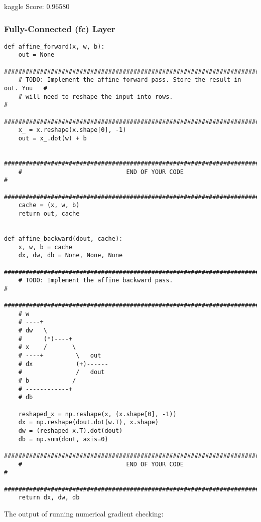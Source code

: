 \documentclass[a4paper,12pt]{article}
\begin{document}
kaggle Score: 0.96580


\clearpage
\subsubsection{Fully-Connected (fc) Layer}
\begin{lstlisting}
def affine_forward(x, w, b):
    out = None
    ###########################################################################
    # TODO: Implement the affine forward pass. Store the result in out. You   #
    # will need to reshape the input into rows.                               #
    ###########################################################################
    x_ = x.reshape(x.shape[0], -1)
    out = x_.dot(w) + b

    ###########################################################################
    #                             END OF YOUR CODE                            #
    ###########################################################################
    cache = (x, w, b)
    return out, cache


def affine_backward(dout, cache):
    x, w, b = cache
    dx, dw, db = None, None, None
    ###########################################################################
    # TODO: Implement the affine backward pass.                               #
    ###########################################################################
    # w
    # ----+
    # dw   \
    #      (*)----+
    # x    /       \
    # ----+         \   out
    # dx            (+)------
    #               /   dout
    # b            /
    # ------------+
    # db  

    reshaped_x = np.reshape(x, (x.shape[0], -1))
    dx = np.reshape(dout.dot(w.T), x.shape)
    dw = (reshaped_x.T).dot(dout)
    db = np.sum(dout, axis=0)
    ###########################################################################
    #                             END OF YOUR CODE                            #
    ###########################################################################
    return dx, dw, db
\end{lstlisting}

The output of running numerical gradient checking:
\end{document}
